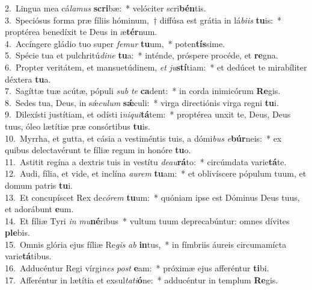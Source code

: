 {2.~}Lingua mea cá\textit{la}\textit{mus} \textbf{scri}bæ:~* velóciter scri\textbf{bén}tis.\\
{3.~}Speciósus forma præ fíliis hóminum,~† diffúsa est grátia in lá\textit{bi}\textit{is} \textbf{tu}is:~* proptérea benedíxit te Deus in æ\textbf{tér}num.\\
{4.~}Accíngere gládio tuo super \textit{fe}\textit{mur} \textbf{tu}um,~* poten\textbf{tís}sime.\\
{5.~}Spécie tua et pulchritú\textit{di}\textit{ne} \textbf{tu}a:~* inténde, próspere procéde, et \textbf{re}gna.\\
{6.~}Propter veritátem, et mansuetúdinem, \textit{et} \textit{ju}\textbf{stí}tiam:~* et dedúcet te mirabíliter déxtera \textbf{tu}a.\\
{7.~}Sagíttæ tuæ acútæ, pópuli \textit{sub} \textit{te} \textbf{ca}dent:~* in corda inimicórum \textbf{Re}gis.\\
{8.~}Sedes tua, Deus, in sǽ\textit{cu}\textit{lum} \textbf{sǽ}culi:~* virga directiónis virga regni \textbf{tu}i.\\
{9.~}Dilexísti justítiam, et odísti i\textit{ni}\textit{qui}\textbf{tá}tem:~* proptérea unxit te, Deus, Deus tuus, óleo lætítiæ præ consórtibus \textbf{tu}is.\\
{10.~}Myrrha, et gutta, et cásia a vestiméntis tuis, a dómi\textit{bus} \textit{e}\textbf{búr}neis:~* ex quibus delectavérunt te fíliæ regum in honóre \textbf{tu}o.\\
{11.~}Astitit regína a dextris tuis in vestítu \textit{de}\textit{au}\textbf{rá}to:~* circúmdata varie\textbf{tá}te.\\
{12.~}Audi, fília, et vide, et inclína \textit{au}\textit{rem} \textbf{tu}am:~* et oblivíscere pópulum tuum, et domum patris \textbf{tu}i.\\
{13.~}Et concupíscet Rex de\textit{có}\textit{rem} \textbf{tu}um:~* quóniam ipse est Dóminus Deus tuus, et adorábunt \textbf{e}um.\\
{14.~}Et fíliæ Tyri \textit{in} \textit{mu}\textbf{né}ribus~* vultum tuum deprecabúntur: omnes dívites \textbf{ple}bis.\\
{15.~}Omnis glória ejus fíliæ Re\textit{gis} \textit{ab} \textbf{in}tus,~* in fímbriis áureis circumamícta varie\textbf{tá}tibus.\\
{16.~}Adducéntur Regi vírgi\textit{nes} \textit{post} \textbf{e}am:~* próximæ ejus afferéntur \textbf{ti}bi.\\
{17.~}Afferéntur in lætítia et exsul\textit{ta}\textit{ti}\textbf{ó}ne:~* adducéntur in templum \textbf{Re}gis.\\
